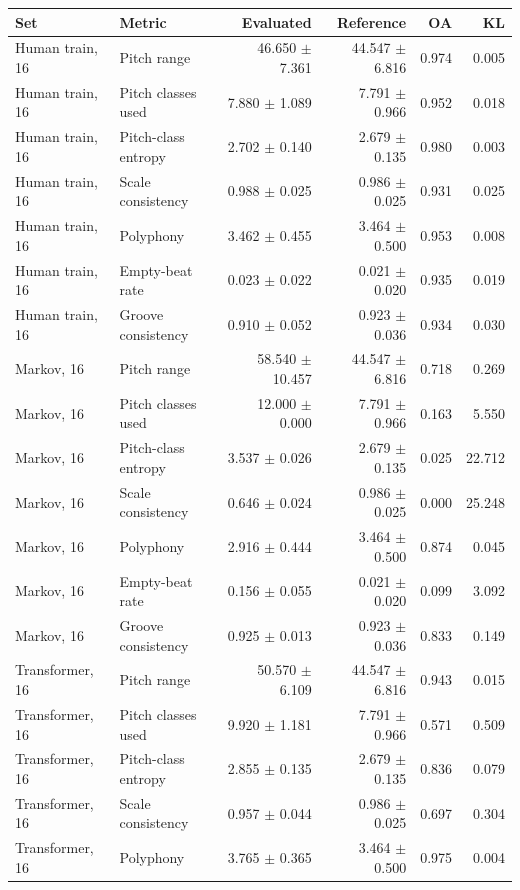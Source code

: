 \begin{tabular}{llrrrr}
\toprule
Set & Metric & Evaluated & Reference & OA & KL \\
\midrule
Human train, 16 & Pitch range & 46.650 $\pm$ 7.361 & 44.547 $\pm$ 6.816 & 0.974 & 0.005 \\
Human train, 16 & Pitch classes used & 7.880 $\pm$ 1.089 & 7.791 $\pm$ 0.966 & 0.952 & 0.018 \\
Human train, 16 & Pitch-class entropy & 2.702 $\pm$ 0.140 & 2.679 $\pm$ 0.135 & 0.980 & 0.003 \\
Human train, 16 & Scale consistency & 0.988 $\pm$ 0.025 & 0.986 $\pm$ 0.025 & 0.931 & 0.025 \\
Human train, 16 & Polyphony & 3.462 $\pm$ 0.455 & 3.464 $\pm$ 0.500 & 0.953 & 0.008 \\
Human train, 16 & Empty-beat rate & 0.023 $\pm$ 0.022 & 0.021 $\pm$ 0.020 & 0.935 & 0.019 \\
Human train, 16 & Groove consistency & 0.910 $\pm$ 0.052 & 0.923 $\pm$ 0.036 & 0.934 & 0.030 \\
Markov, 16 & Pitch range & 58.540 $\pm$ 10.457 & 44.547 $\pm$ 6.816 & 0.718 & 0.269 \\
Markov, 16 & Pitch classes used & 12.000 $\pm$ 0.000 & 7.791 $\pm$ 0.966 & 0.163 & 5.550 \\
Markov, 16 & Pitch-class entropy & 3.537 $\pm$ 0.026 & 2.679 $\pm$ 0.135 & 0.025 & 22.712 \\
Markov, 16 & Scale consistency & 0.646 $\pm$ 0.024 & 0.986 $\pm$ 0.025 & 0.000 & 25.248 \\
Markov, 16 & Polyphony & 2.916 $\pm$ 0.444 & 3.464 $\pm$ 0.500 & 0.874 & 0.045 \\
Markov, 16 & Empty-beat rate & 0.156 $\pm$ 0.055 & 0.021 $\pm$ 0.020 & 0.099 & 3.092 \\
Markov, 16 & Groove consistency & 0.925 $\pm$ 0.013 & 0.923 $\pm$ 0.036 & 0.833 & 0.149 \\
Transformer, 16 & Pitch range & 50.570 $\pm$ 6.109 & 44.547 $\pm$ 6.816 & 0.943 & 0.015 \\
Transformer, 16 & Pitch classes used & 9.920 $\pm$ 1.181 & 7.791 $\pm$ 0.966 & 0.571 & 0.509 \\
Transformer, 16 & Pitch-class entropy & 2.855 $\pm$ 0.135 & 2.679 $\pm$ 0.135 & 0.836 & 0.079 \\
Transformer, 16 & Scale consistency & 0.957 $\pm$ 0.044 & 0.986 $\pm$ 0.025 & 0.697 & 0.304 \\
Transformer, 16 & Polyphony & 3.765 $\pm$ 0.365 & 3.464 $\pm$ 0.500 & 0.975 & 0.004 \\

\end{tabular}

